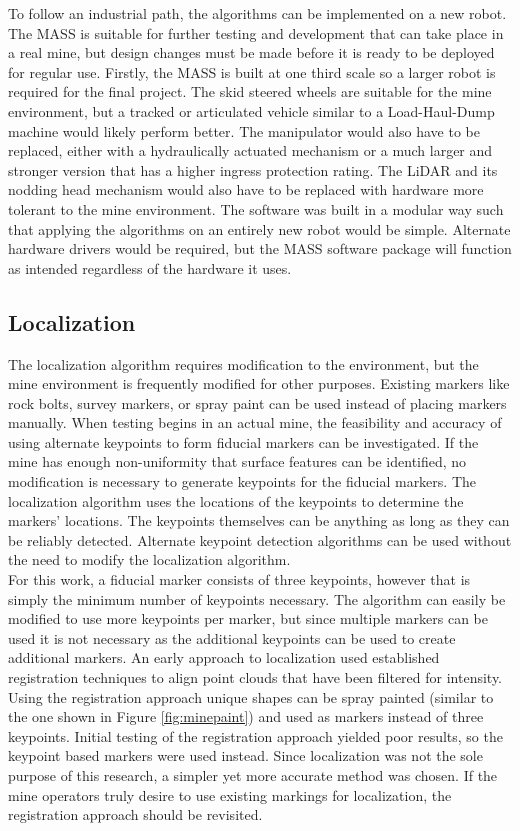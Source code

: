To follow an industrial path, the algorithms can be implemented on a new robot. The MASS is suitable for further testing and development that can take place in a real mine, but design changes must be made before it is ready to be deployed for regular use. Firstly, the MASS is built at one third scale so a larger robot is required for the final project. The skid steered wheels are suitable for the mine environment, but a tracked or articulated vehicle similar to a Load-Haul-Dump machine would likely perform better. The manipulator would also have to be replaced, either with a hydraulically actuated mechanism or a much larger and stronger version that has a higher ingress protection rating. The LiDAR and its nodding head mechanism would also have to be replaced with hardware more tolerant to the mine environment. The software was built in a modular way such that applying the algorithms on an entirely new robot would be simple. Alternate hardware drivers would be required, but the MASS software package will function as intended regardless of the hardware it uses.\\

\subsection{Localization}

The localization algorithm requires modification to the environment, but the mine environment is frequently modified for other purposes. Existing markers like rock bolts, survey markers, or spray paint can be used instead of placing markers manually. When testing begins in an actual mine, the feasibility and accuracy of using alternate keypoints to form fiducial markers can be investigated. If the mine has enough non-uniformity that surface features can be identified, no modification is necessary to generate keypoints for the fiducial markers. The localization algorithm uses the locations of the keypoints to determine the markers' locations. The keypoints themselves can be anything as long as they can be reliably detected. Alternate keypoint detection algorithms can be used without the need to modify the localization algorithm.\\

For this work, a fiducial marker consists of three keypoints, however that is simply the minimum number of keypoints necessary. The algorithm can easily be modified to use more keypoints per marker, but since multiple markers can be used it is not necessary as the additional keypoints can be used to create additional markers. An early approach to localization used established registration techniques to align point clouds that have been filtered for intensity. Using the registration approach unique shapes can be spray painted (similar to the one shown in Figure \ref{fig:minepaint}) and used as markers instead of three keypoints. Initial testing of the registration approach yielded poor results, so the keypoint based markers were used instead. Since localization was not the sole purpose of this research, a simpler yet more accurate method was chosen. If the mine operators truly desire to use existing markings for localization, the registration approach should be revisited.\\


